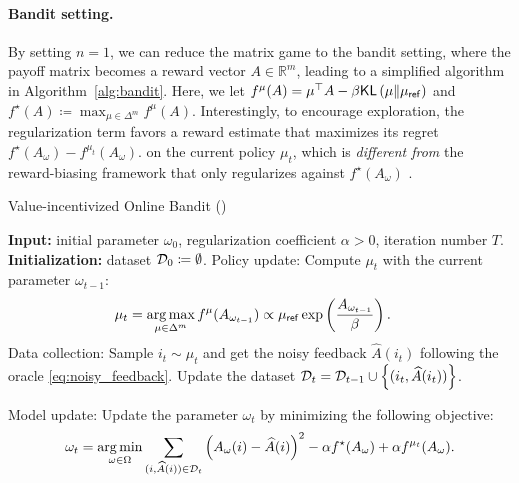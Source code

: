 \paragraph{Bandit setting.} By setting $n=1$, we can reduce the matrix game to the bandit setting, where the payoff matrix becomes a reward vector $ A \in \mathbb{R}^{m}$, leading to a simplified algorithm in Algorithm~\ref{alg:bandit}. Here, we let $f^{\mu}(A) = \mu^{\top} A - \beta\mathsf{KL}\left(\mu\|\mu_{\mathsf{ref}}\right)$ and 
     $f^{\star}(A)\coloneqq \max_{\mu\in\Delta^m} f^{\mu}(A)$. Interestingly, to encourage exploration, the regularization term favors a reward estimate that maximizes its regret $  f^{\star}(A_{\omega}) -  f^{\mu_t}(A_{\omega}).$ on the current policy $\mu_t$, which is {\em different from} the reward-biasing framework that only regularizes against $  f^{\star}(A_{\omega})$ \citep{cen2024value,liu2020exploration}.   
     
\begin{algorithm}[th]
    \caption{Value-incentivized Online Bandit (\name)}
    \label{alg:bandit}
    \begin{algorithmic}[1]
    \STATE \textbf{Input:}  initial parameter $\omega_0$, regularization coefficient $\alpha>0$, iteration number $T$.  
    \STATE \textbf{Initialization:} dataset ${\mathcal{D}}_0\coloneqq \emptyset$.
    \STATE 
    Policy update: Compute $\mu_t$ with the current parameter $\omega_{t-1}$:
    \begin{align}%
        \mu_t&=\argmax_{\mu\in\Delta^m}  f^{\mu}(A_{\omega_{t-1}})  \propto \muref \exp\left( \frac{A_{\omega_{t-1}} }{ \beta } \right).
    \end{align}
        \STATE Data collection: Sample $i_t \sim \mu_t $  and get the noisy feedback $\widehat{A}(i_t)$  following the oracle \eqref{eq:noisy_feedback}. Update the dataset ${{\mathcal{D}}}_t={\mathcal{D}}_{t-1}\cup\left\{ (i_t,\widehat{A}(i_t) ) \right\}$.
   
    \STATE Model update: Update the parameter $\omega_t$ by minimizing the following objective:  
    \begin{align}%
        \omega_t=\argmin_{\omega\in\Omega}\sum_{(i,\widehat{A}(i))\in\gD_{t}}\left(A_\omega(i)-\widehat{A}(i)\right)^2 -\alpha f^{\star}(A_{\omega})+\alpha f^{\mu_t}(A_{\omega}).
    \end{align}

    \ENDFOR 
    \end{algorithmic}
\end{algorithm}


